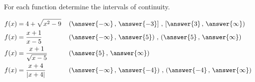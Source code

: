 \documentclass{ximera}
\author{Nela Lakos \and Kyle Parsons}
\begin{document}
\begin{exercise}

For each function determine the intervals of continuity.

\begin{align*}
	f(x) &= 4+\sqrt{x^2-9} && \left(\answer{-\infty}\, , \,\answer{-3}\right] \, , \, \left[\answer{3}\, , \,\answer{\infty}\right)\\
	f(x) &= \frac{x+1}{x-5} && \left(\answer{-\infty}\, , \,\answer{5}\right) \, , \, \left(\answer{5}\, , \,\answer{\infty}\right)\\
	f(x) &= \frac{x+1}{\sqrt{x-5}} && \left(\answer{5}\, , \,\answer{\infty}\right)\\
	f(x) &= \frac{x+4}{\left|x+4\right|} && \left(\answer{-\infty}\, , \,\answer{-4}\right) \, , \, \left(\answer{-4}\, , \,\answer{\infty}\right)
\end{align*}

\end{exercise}
\end{document}
